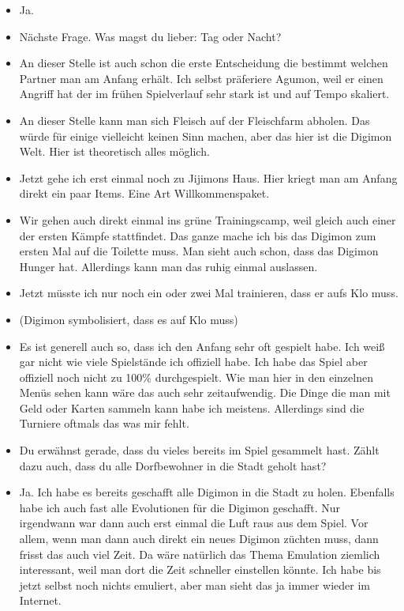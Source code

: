 {\begin{itemize}[]
    \item {} Ja. 
    \item {} \frq Nächste Frage. Was magst du lieber: Tag oder Nacht?\flq{} 
    \item {} An dieser Stelle ist auch schon die erste Entscheidung die bestimmt welchen Partner man am Anfang erhält. Ich selbst präferiere Agumon, weil er einen Angriff hat der im frühen Spielverlauf sehr stark ist und auf Tempo skaliert.
    \item {} An dieser Stelle kann man sich Fleisch auf der Fleischfarm abholen. Das würde für einige vielleicht keinen Sinn machen, aber das hier ist die Digimon Welt. Hier ist theoretisch alles möglich. 
    \item {} Jetzt gehe ich erst einmal noch zu Jijimons Haus. Hier kriegt man am Anfang direkt ein paar Items. Eine Art Willkommenspaket. 
    \item {} Wir gehen auch direkt einmal ins grüne Trainingscamp, weil gleich auch einer der ersten Kämpfe stattfindet. Das ganze mache ich bis das Digimon zum ersten Mal auf die Toilette muss. Man sieht auch schon, dass das Digimon Hunger hat. Allerdings kann man das ruhig einmal auslassen. 
    \item {} Jetzt müsste ich nur noch ein oder zwei Mal trainieren, dass er aufs Klo muss. 
    \item {} (Digimon symbolisiert, dass es auf Klo muss)
    \item {} Es ist generell auch so, dass ich den Anfang sehr oft gespielt habe. Ich weiß gar nicht wie viele Spielstände ich offiziell habe. Ich habe das Spiel aber offiziell noch nicht zu 100\% durchgespielt. Wie man hier in den einzelnen Menüs sehen kann wäre das auch sehr zeitaufwendig. Die Dinge die man mit Geld oder Karten sammeln kann habe ich meistens. Allerdings sind die Turniere oftmals das was mir fehlt. \item {} Du erwähnst gerade, dass du vieles bereits im Spiel gesammelt hast. Zählt dazu auch, dass du alle Dorfbewohner in die Stadt geholt hast?
    \item {} Ja. Ich habe es bereits geschafft alle Digimon in die Stadt zu holen. Ebenfalls habe ich auch fast alle Evolutionen für die Digimon geschafft. Nur irgendwann war dann auch erst einmal die Luft raus aus dem Spiel. Vor allem, wenn man dann auch direkt ein neues Digimon züchten muss, dann frisst das auch viel Zeit. Da wäre natürlich das Thema Emulation ziemlich interessant, weil man dort die Zeit schneller einstellen könnte. Ich habe bis jetzt selbst noch nichts emuliert, aber man sieht das ja immer wieder im Internet.

\end{itemize}}
